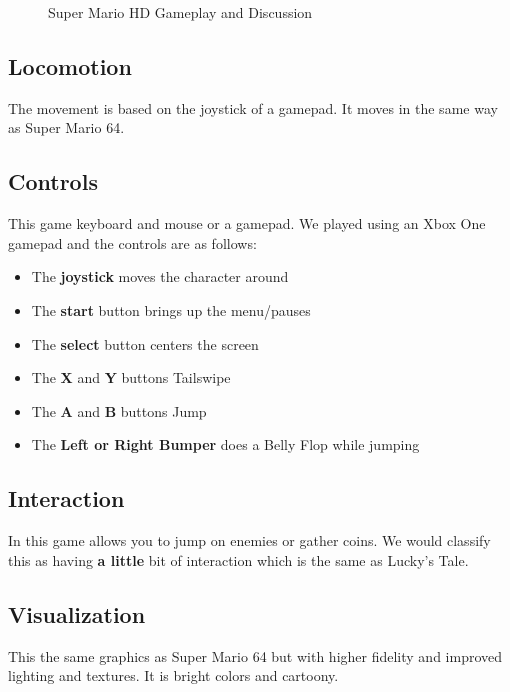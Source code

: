 \documentclass[journal]{IEEEtran}
\begin{document}
\begin{figure}[h]
	\centering
		\caption{Super Mario HD Gameplay and Discussion}
		\label{SuperMarioHD_Gameplay}
\end{figure}

\subsection{Locomotion}
The movement is based on the joystick of a gamepad. It moves in the same way as Super Mario 64.
\subsection{Controls}
This game keyboard and mouse or a gamepad. We played using an Xbox One gamepad and the controls are as follows: 

\begin{itemize}
	\item The \textbf{joystick} moves the character around
	\item The \textbf{start} button brings up the menu/pauses
	\item The \textbf{select} button centers the screen
	\item The \textbf{X} and \textbf{Y} buttons Tailswipe
	\item The \textbf{A} and \textbf{B} buttons Jump
	\item The \textbf{Left or Right Bumper} does a Belly Flop while jumping
\end{itemize}
\subsection{Interaction}
In this game allows you to jump on enemies or gather coins. We would classify this as having \textbf{a little} bit of interaction which is the same as Lucky's Tale. 
\subsection{Visualization}
This the same graphics as Super Mario 64 but with higher fidelity and improved lighting and textures.
It is bright colors and cartoony. 
\end{document}
